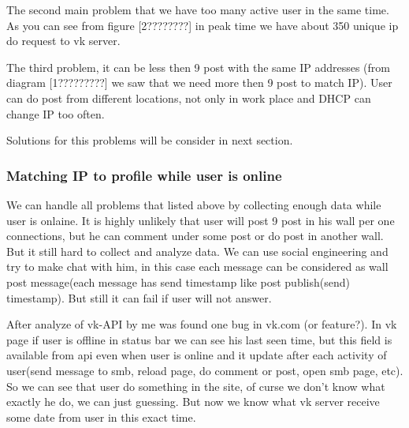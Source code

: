 The second main problem that we have too many active user in the same time. As you can see from figure [2????????] in peak time we have about 350 unique ip do request to vk server. 

The third problem, it can be less then 9 post with the same IP addresses (from diagram [1?????????] we saw that we need more then 9 post to match IP). User can do post from different locations, not only in work place and DHCP can change IP too often.

Solutions for this problems will be consider in next section.
\begin{figure}
\end{figure}
\subsubsection{Matching IP to profile while user is online}
We can handle all problems that listed above by collecting enough data while user is onlaine. It is highly unlikely that user will post 9 post in his wall per one connections, but he can comment under some post or do post in another wall. But it still hard to collect and  analyze data. We can use social engineering and try to make chat with him, in this case each message can be considered as wall post message(each message has send timestamp like post publish(send) timestamp). But still it can fail if user will not answer. 

After analyze of vk-API by me was found one bug in vk.com (or feature?). In vk page if user is offline in status bar we can see his last seen time, but this field is available from api even when user is online and it update after each activity of user(send message to smb, reload page, do comment or post, open smb page, etc). So we can see that user do something in the site, of curse we don't know what exactly he do, we can just guessing. But now we know what vk server receive some date from user in this exact time.

